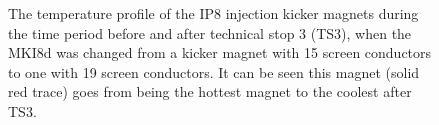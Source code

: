\begin{figure}
\label{fig:heating-mki8-post-ts3}
\caption{The temperature profile of the IP8 injection kicker magnets during the time period before and after technical stop 3  (TS3), when the MKI8d was changed from a kicker magnet with 15 screen conductors to one with 19 screen conductors. It can be seen this magnet (solid red trace) goes from being the hottest magnet to the coolest after TS3.}
\end{figure}